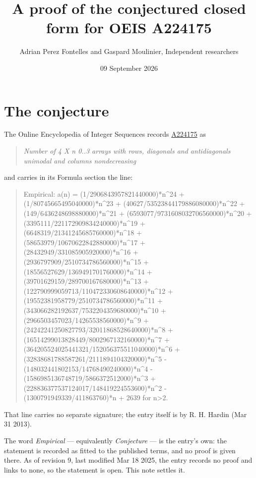 \documentclass[11pt]{article}
\title{A proof of the conjectured closed form for OEIS A224175}
\author{Adrian Perez Fontelles and Gaspard Moulinier, Independent researchers}
\date{09 September 2026}
\theoremstyle{definition}
\begin{document}
\maketitle
\section{The conjecture}

The Online Encyclopedia of Integer Sequences records \href{https://oeis.org/A224175}{A224175} as

\begin{quote}\itshape Number of 4 X n 0..3 arrays with rows, diagonals and antidiagonals unimodal and columns nondecreasing\end{quote}

and carries in its Formula section the line:

\begin{quote}\ttfamily Empirical: a(n) = (1/2906843957821440000)*n\textasciicircum{}24 + (1/80745665495040000)*n\textasciicircum{}23 + (40627/53523844179886080000)*n\textasciicircum{}22 + (149/6436248698880000)*n\textasciicircum{}21 + (6593077/9731608032706560000)*n\textasciicircum{}20 + (3395111/221172909834240000)*n\textasciicircum{}19 + (6648319/21341245685760000)*n\textasciicircum{}18 + (58653979/10670622842880000)*n\textasciicircum{}17 + (28432949/331085905920000)*n\textasciicircum{}16 + (2936797909/2510734786560000)*n\textasciicircum{}15 + (18556527629/1369491701760000)*n\textasciicircum{}14 + (39701629159/289700167680000)*n\textasciicircum{}13 + (122790999059713/110472330608640000)*n\textasciicircum{}12 + (19552381958779/2510734786560000)*n\textasciicircum{}11 + (343066282192637/7532204359680000)*n\textasciicircum{}10 + (2966503457023/14265538560000)*n\textasciicircum{}9 + (24242241250827793/32011868528640000)*n\textasciicircum{}8 + (16514299013828449/8002967132160000)*n\textasciicircum{}7 + (364205524025441321/152056375511040000)*n\textasciicircum{}6 + (32838681788587261/2111894104320000)*n\textasciicircum{}5 - (148032441802153/14768490240000)*n\textasciicircum{}4 - (1586985136748719/5866372512000)*n\textasciicircum{}3 + (228836377537124017/148419224553600)*n\textasciicircum{}2 - (1300791949339/411863760)*n + 2639 for n>2.\end{quote}

That line carries no separate signature; the entry itself is by R. H. Hardin (Mar 31 2013).

The word {\itshape Empirical} --- equivalently {\itshape Conjecture} --- is the entry's own: the statement is recorded as fitted to the published terms, and no proof is given there. As of revision 9, last modified Mar 18 2025, the entry records no proof and links to none, so the statement is open. This note settles it.
\end{document}
